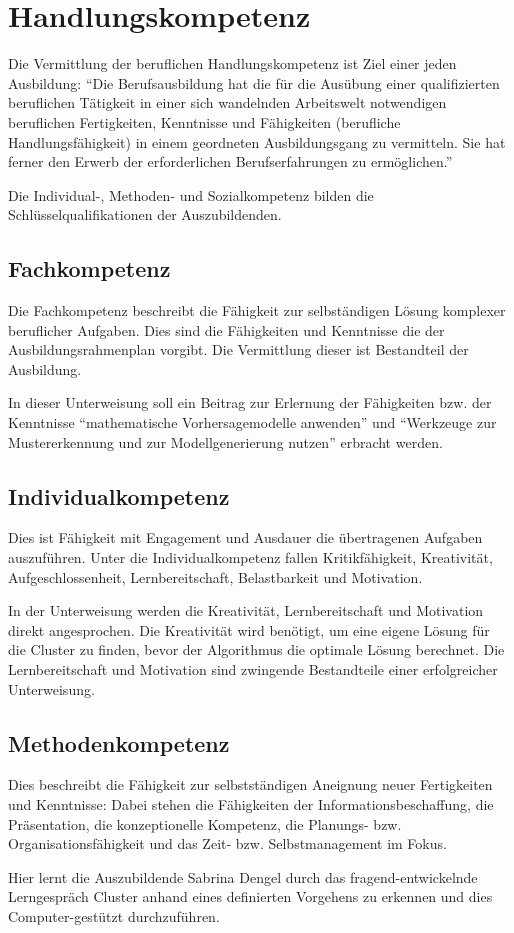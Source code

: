 \chapter{Handlungskompetenz}
Die Vermittlung der beruflichen Handlungskompetenz ist Ziel einer jeden Ausbildung: \enquote{Die Berufsausbildung hat die für die Ausübung einer qualifizierten beruflichen Tätigkeit in einer sich wandelnden Arbeitswelt notwendigen beruflichen Fertigkeiten, Kenntnisse und Fähigkeiten (berufliche Handlungsfähigkeit) in einem geordneten Ausbildungsgang zu vermitteln. Sie hat ferner den Erwerb der erforderlichen Berufserfahrungen zu ermöglichen.}\autocite[][§1\,III BBiG]{berufsbildungsgesetz_bbig_bbig_nodate} 
\par
Die Individual-, Methoden- und Sozialkompetenz bilden die Schlüsselqualifikationen der Auszubildenden. 

\section{Fachkompetenz}
Die Fachkompetenz beschreibt die Fähigkeit zur selbständigen Lösung komplexer beruflicher Aufgaben. Dies sind die Fähigkeiten und Kenntnisse die der Ausbildungsrahmenplan vorgibt. Die Vermittlung dieser ist Bestandteil der Ausbildung. 
\par
In dieser Unterweisung soll ein Beitrag zur Erlernung der Fähigkeiten bzw. der Kenntnisse \enquote{mathematische Vorhersagemodelle anwenden} und \enquote{Werkzeuge zur Mustererkennung und zur Modellgenerierung nutzen} erbracht werden.

\section{Individualkompetenz}
Dies ist Fähigkeit mit Engagement und Ausdauer die übertragenen Aufgaben auszuführen. Unter die Individualkompetenz fallen Kritikfähigkeit, Kreativität, Aufgeschlossenheit,  Lernbereitschaft, Belastbarkeit und Motivation.
\par
In der Unterweisung werden die Kreativität, Lernbereitschaft und Motivation direkt angesprochen. Die Kreativität wird benötigt, um eine eigene Lösung für die Cluster zu finden, bevor der Algorithmus die optimale Lösung berechnet. Die Lernbereitschaft und Motivation sind zwingende Bestandteile einer erfolgreicher Unterweisung. 

\section{Methodenkompetenz}
Dies beschreibt die Fähigkeit zur selbstständigen Aneignung neuer Fertigkeiten und Kenntnisse: Dabei stehen die Fähigkeiten der Informationsbeschaffung, die Präsentation, die konzeptionelle Kompetenz, die Planungs- bzw. Organisationsfähigkeit und das Zeit- bzw. Selbstmanagement im Fokus.
\par
Hier lernt die Auszubildende Sabrina Dengel durch das fragend-entwickelnde Lerngespräch Cluster anhand eines definierten Vorgehens zu erkennen und dies Computer-gestützt durchzuführen.

